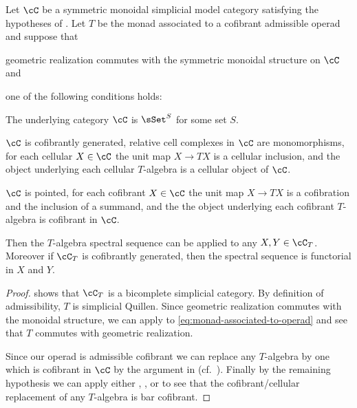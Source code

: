 \documentclass[leqno,oneside,english]{elsarticle}
\begin{document}
\begin{prop}\label{prop:cofibrant-operad}
  Let $\cC$ be a symmetric monoidal simplicial model category
  satisfying the hypotheses of
  .
  Let $T$ be the monad associated to a cofibrant admissible operad and suppose that
  \begin{hypothenumerate}
  \item geometric realization commutes with the symmetric monoidal
    structure on $\cC$ and
  \item one of the following conditions holds:
  \begin{hypothenumerate}
  \item The underlying category $\cC$ is $\sSet^{S}$ for some set $S$.   
  \item $\cC$ is cofibrantly generated, relative cell complexes in
    $\cC$ are monomorphisms, for each cellular $X\in \cC$ the unit map
    $X\rightarrow TX$ is a cellular inclusion, and the object
    underlying each cellular $T$-algebra is a
    cellular object of $\cC$.
  \item $\cC$ is pointed, for each cofibrant $X\in \cC$ the unit map
    $X\rightarrow TX$ is a cofibration and the inclusion of a summand,
    and the the object underlying each cofibrant $T$-algebra is
    cofibrant in $\cC$.
  \end{hypothenumerate}
  \end{hypothenumerate}
  Then the $T$-algebra spectral sequence can be applied to any $X,Y\in
  \cC_T$. Moreover if $\cC_T$ is cofibrantly generated, then the
  spectral sequence is functorial in $X$ and $Y$.
\end{prop}
\begin{proof}
  shows that $\cC_T$ is a bicomplete simplicial category. By definition of admissibility, $T$ is simplicial Quillen.  Since geometric realization commutes with the monoidal structure, we can apply  to \eqref{eq:monad-associated-to-operad} and see that $T$ commutes with geometric realization.

  
  Since our operad is admissible cofibrant we can replace any $T$-algebra by one which
is cofibrant in $\cC$ by the argument in \cite[Rem.~13.3]{Rez97}
(cf.~\cite[Thm.~3.5(b)]{BeM03}). Finally by the remaining hypothesis we can
apply either , ,
or  to see that the cofibrant/cellular replacement of any $T$-algebra is bar cofibrant. 
\end{proof}
\end{document}
